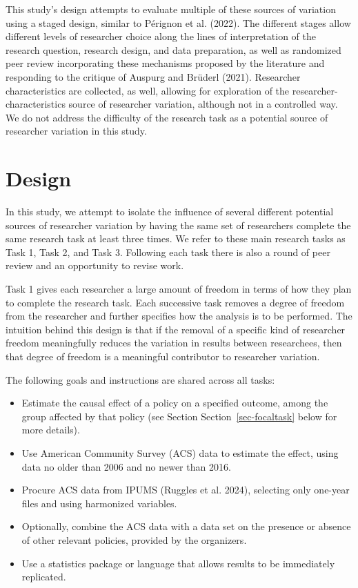 \documentclass[
  letterpaper,
  DIV=11,
  numbers=noendperiod]{scrartcl}
\begin{document}
This study's design attempts to evaluate multiple of these sources of
variation using a staged design, similar to Pérignon et al. (2022). The
different stages allow different levels of researcher choice along the
lines of interpretation of the research question, research design, and
data preparation, as well as randomized peer review incorporating these
mechanisms proposed by the literature and responding to the critique of
Auspurg and Brüderl (2021). Researcher characteristics are collected, as
well, allowing for exploration of the researcher-characteristics source
of researcher variation, although not in a controlled way. We do not
address the difficulty of the research task as a potential source of
researcher variation in this study.

\hypertarget{design}{%
\section{Design}\label{design}}

In this study, we attempt to isolate the influence of several different
potential sources of researcher variation by having the same set of
researchers complete the same research task at least three times. We
refer to these main research tasks as Task 1, Task 2, and Task 3.
Following each task there is also a round of peer review and an
opportunity to revise work.

Task 1 gives each researcher a large amount of freedom in terms of how
they plan to complete the research task. Each successive task removes a
degree of freedom from the researcher and further specifies how the
analysis is to be performed. The intuition behind this design is that if
the removal of a specific kind of researcher freedom meaningfully
reduces the variation in results between researchees, then that degree
of freedom is a meaningful contributor to researcher variation.

The following goals and instructions are shared across all tasks:

\begin{itemize}
\item
  Estimate the causal effect of a policy on a specified outcome, among
  the group affected by that policy (see Section
  Section~\ref{sec-focaltask} below for more details).
\item
  Use American Community Survey (ACS) data to estimate the effect, using
  data no older than 2006 and no newer than 2016.
\item
  Procure ACS data from IPUMS (Ruggles et al. 2024), selecting only
  one-year files and using harmonized variables.
\item
  Optionally, combine the ACS data with a data set on the presence or
  absence of other relevant policies, provided by the organizers.
\item
  Use a statistics package or language that allows results to be
  immediately replicated.
\end{itemize}
\end{document}
